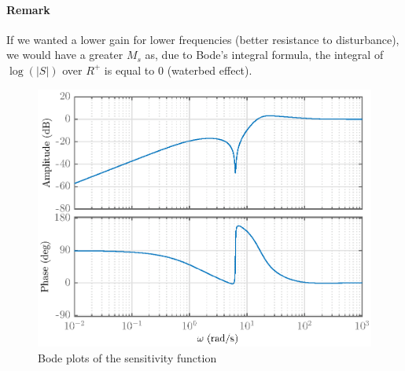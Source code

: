 \paragraph{Remark}If we wanted a lower gain for lower frequencies (better resistance to disturbance), we would have a greater $M_s$ as, due to Bode's integral formula, the integral of $\log(|S|)$ over $R^+$ is equal to $0$ (waterbed effect). 
\begin{figure}[H]
    \centering
    \includegraphics[scale = 0.8]{resources/eps/4-Val/S.eps}
    \caption{Bode plots of the sensitivity function}
    \label{fig:sensitivity}
\end{figure}

